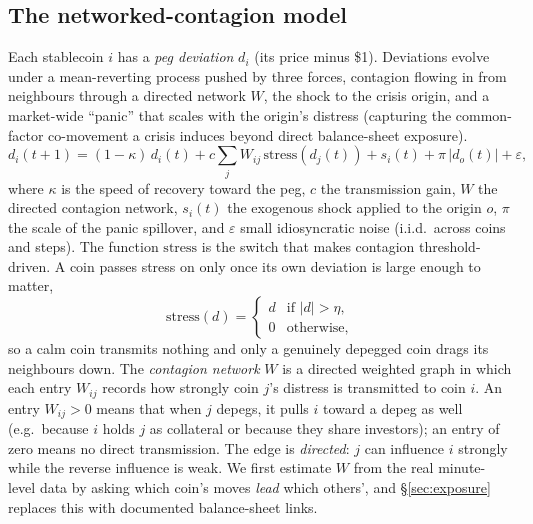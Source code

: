 \documentclass[sigconf,anonymous]{acmart}
\begin{document}
\subsection{The networked-contagion model}
Each stablecoin $i$ has a \emph{peg deviation} $d_i$ (its price minus \$1). Deviations evolve under
a mean-reverting process pushed by three forces, contagion flowing in from neighbours through a
directed network $W$, the shock to the crisis origin, and a market-wide ``panic'' that scales with
the origin's distress (capturing the common-factor co-movement a crisis induces beyond direct
balance-sheet exposure).
\begin{equation}
d_i(t{+}1)=(1{-}\kappa)\,d_i(t)+c\!\sum_j W_{ij}\,\mathrm{stress}(d_j(t))+s_i(t)+\pi\,|d_o(t)|+\varepsilon,
\label{eq:model}
\end{equation}
where $\kappa$ is the speed of recovery toward the peg, $c$ the transmission gain, $W$ the
directed contagion network, $s_i(t)$ the exogenous shock applied to the origin $o$, $\pi$ the
scale of the panic spillover, and $\varepsilon$ small idiosyncratic noise (i.i.d.\ across coins
and steps). The function $\mathrm{stress}$ is the
switch that makes contagion threshold-driven. A coin passes stress on only once its own deviation is
large enough to matter,
\begin{equation}
\mathrm{stress}(d)=\begin{cases} d & \text{if } |d|>\eta,\\[2pt] 0 & \text{otherwise,}\end{cases}
\end{equation}
so a calm coin transmits nothing and only a genuinely depegged coin drags its neighbours down. The
\emph{contagion network} $W$ is a directed weighted graph in which each entry
$W_{ij}$ records how strongly coin $j$'s distress is transmitted to coin $i$.  An
entry $W_{ij}>0$ means that when $j$ depegs, it pulls $i$ toward a depeg as well
(e.g.\ because $i$ holds $j$ as collateral or because they share investors); an entry of zero
means no direct transmission. The edge is \emph{directed}: $j$ can influence $i$ strongly while
the reverse influence is weak.
We first estimate $W$ from the real minute-level data by asking which coin's moves
\emph{lead} which others', and \S\ref{sec:exposure} replaces this with documented balance-sheet links.
\end{document}
